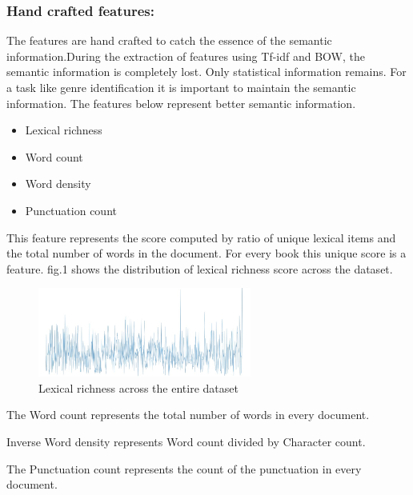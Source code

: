 \documentclass[conference]{IEEEtran}
\begin{document}
\subsubsection{Hand crafted features:}
\justify The features are hand crafted \cite{Polley,Polleya} to catch the essence of the semantic information.During the extraction of features using Tf-idf and BOW, the semantic information is completely lost. Only statistical information remains. For a task like genre identification it is important to maintain the semantic information. The features below represent better semantic information.
\begin{itemize}
    \item Lexical richness
    \item Word count
    \item Word density
    \item Punctuation count
\end{itemize}

\justify {} 
This feature represents the score computed by ratio of unique lexical items and the total number of words in the document. For every book this unique score is a feature. fig.1 shows the distribution of lexical richness score across the dataset.
\begin{figure}
    \centering
    \includegraphics[width=7cm]{lexical_richness}
    \caption{Lexical richness across the entire dataset}
    \label{fig:galaxy}
\end{figure}

\justify {}
The Word count represents the total number of words in every document. 


\justify {}
Inverse Word density represents Word count divided by Character count.

\justify {}
The Punctuation count represents the count of the punctuation in every document.
\end{document}

